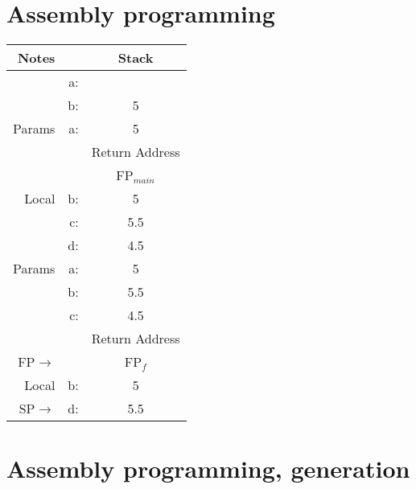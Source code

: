 \section{Assembly programming}
\begin{table}[H]
\centering
	\begin{tabular}{|r|r||c|}
	\hline
	Notes	& & Stack \\ \hline
			& a: & 		\\ \hline		
			& b: & 5	\\ \hline
	Params	& a: & 5	\\ \hline	
			& &Return Address  \\ \hline
			& &FP$_{main}$ \\ \hline
	Local	& b: & 5	\\ \hline
			& c: & 5.5	\\ \hline
			& d: & 4.5	\\ \hline
	Params	& a: & 5	\\ \hline
			& b: & 5.5	\\ \hline
			& c: & 4.5	\\ \hline
			& &Return Address \\ \hline
	FP$\rightarrow$& &FP$_f$ 	\\ \hline
	Local	& b: & 5	\\ \hline
	SP$\rightarrow$	& d: & 5.5	\\ \hline
	\end{tabular}
\end{table}


\newpage
\section{Assembly programming, generation}


